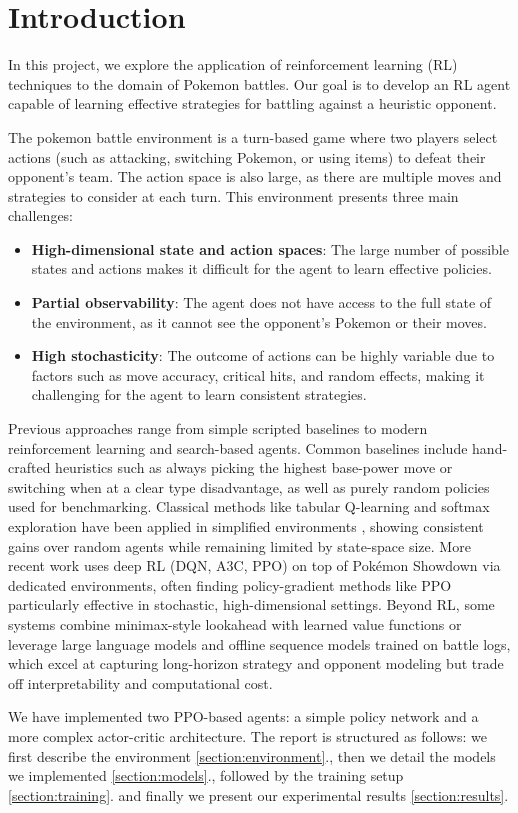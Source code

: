 \section{Introduction}

In this project, we explore the application of reinforcement learning (RL) techniques to the domain of Pokemon battles. 
Our goal is to develop an RL agent capable of learning effective strategies for battling against a heuristic opponent.

The pokemon battle environment is a turn-based game where two players select actions (such as attacking, switching Pokemon, or using items) to defeat their opponent's team.
The action space is also large, as there are multiple moves and strategies to consider at each turn.
This environment presents three main challenges:
\begin{itemize}
    \item \textbf{High-dimensional state and action spaces}: The large number of possible states and actions makes it difficult for the agent to learn effective policies.
    \item \textbf{Partial observability}: The agent does not have access to the full state of the environment, as it cannot see the opponent's Pokemon or their moves.
    \item \textbf{High stochasticity}: The outcome of actions can be highly variable due to factors such as move accuracy, critical hits, and random effects, making it challenging for the agent to learn consistent strategies.
\end{itemize}

Previous approaches range from simple scripted baselines to modern reinforcement learning and search-based agents. 
Common baselines include hand-crafted heuristics such as always picking the highest base-power move or switching when at a clear type disadvantage, as well as purely random policies used for benchmarking. 
Classical methods like tabular Q-learning and softmax exploration have been applied in simplified environments \cite{kalose2018optimal}, showing consistent gains over random agents while remaining limited by state-space size. 
More recent work uses deep RL (DQN, A3C, PPO) on top of Pokémon Showdown via dedicated environments, often finding policy-gradient methods like PPO particularly effective in stochastic, high-dimensional settings. 
Beyond RL, some systems combine minimax-style lookahead with learned value functions or leverage large language models \cite{jain2025large} and offline sequence models trained on battle logs, which excel at capturing long-horizon strategy and opponent modeling but trade off interpretability and computational cost.

We have implemented two PPO-based agents: a simple policy network and a more complex actor-critic architecture.
The report is structured as follows: we first describe the environment \ref{section:environment}., then we detail the models we implemented \ref{section:models}., followed by the training setup \ref{section:training}. and finally we present our experimental results \ref{section:results}.